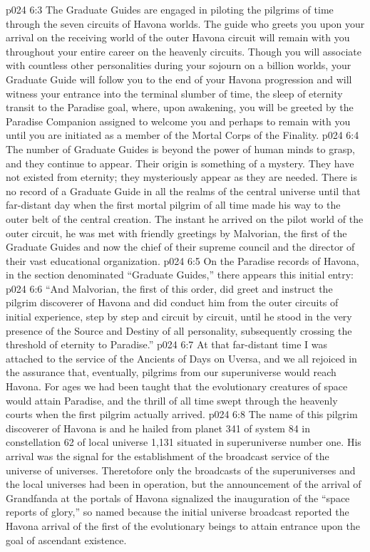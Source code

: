 \vs p024 6:3 The Graduate Guides are engaged in piloting the pilgrims of time through the seven circuits of Havona worlds. The guide who greets you upon your arrival on the receiving world of the outer Havona circuit will remain with you throughout your entire career on the heavenly circuits. Though you will associate with countless other personalities during your sojourn on a billion worlds, your Graduate Guide will follow you to the end of your Havona progression and will witness your entrance into the terminal slumber of time, the sleep of eternity transit to the Paradise goal, where, upon awakening, you will be greeted by the Paradise Companion assigned to welcome you and perhaps to remain with you until you are initiated as a member of the Mortal Corps of the Finality.
\pc \vs p024 6:4 The number of Graduate Guides is beyond the power of human minds to grasp, and they continue to appear. Their origin is something of a mystery. They have not existed from eternity; they mysteriously appear as they are needed. There is no record of a Graduate Guide in all the realms of the central universe until that far\hyp{}distant day when the first mortal pilgrim of all time made his way to the outer belt of the central creation. The instant he arrived on the pilot world of the outer circuit, he was met with friendly greetings by Malvorian, the first of the Graduate Guides and now the chief of their supreme council and the director of their vast educational organization.
\vs p024 6:5 On the Paradise records of Havona, in the section denominated “Graduate Guides,” there appears this initial entry:
\vs p024 6:6 “And Malvorian, the first of this order, did greet and instruct the pilgrim discoverer of Havona and did conduct him from the outer circuits of initial experience, step by step and circuit by circuit, until he stood in the very presence of the Source and Destiny of all personality, subsequently crossing the threshold of eternity to Paradise.”
\vs p024 6:7 At that far\hyp{}distant time I was attached to the service of the Ancients of Days on Uversa, and we all rejoiced in the assurance that, eventually, pilgrims from our superuniverse would reach Havona. For ages we had been taught that the evolutionary creatures of space would attain Paradise, and the thrill of all time swept through the heavenly courts when the first pilgrim actually arrived.
\pc \vs p024 6:8 The name of this pilgrim discoverer of Havona is  and he hailed from planet 341 of system 84 in constellation 62 of local universe 1,131 situated in superuniverse number one. His arrival was the signal for the establishment of the broadcast service of the universe of universes. Theretofore only the broadcasts of the superuniverses and the local universes had been in operation, but the announcement of the arrival of Grandfanda at the portals of Havona signalized the inauguration of the “space reports of glory,” so named because the initial universe broadcast reported the Havona arrival of the first of the evolutionary beings to attain entrance upon the goal of ascendant existence.
